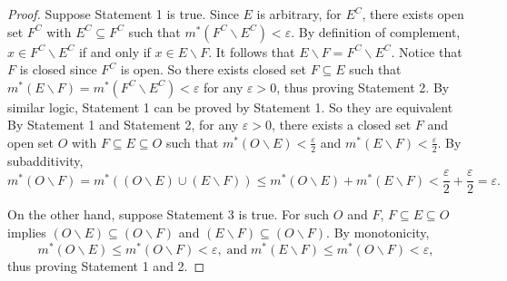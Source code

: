 \documentclass[class=book, crop=false]{standalone}
\begin{document}
    \begin{proof}
        Suppose Statement 1 is true. Since $E$ is arbitrary, for $E^C$, there exists open set $F^C$ with $E^C \subseteq F^C$ such that $m^*(F^C \backslash E^C) < \varepsilon$. By definition of complement, $x \in F^C \backslash E^C$ if and only if $x \in E \backslash F$. It follows that $E \backslash F = F^C \backslash E^C$. Notice that $F$ is closed since $F^C$ is open. So there exists closed set $F \subseteq E$ such that $m^*(E \backslash F) = m^*(F^C \backslash E^C) < \varepsilon$ for any $\varepsilon > 0$, thus proving Statement 2. By similar logic, Statement 1 can be proved by Statement 1. So they are equivalent\\

        \noindent By Statement 1 and Statement 2, for any $\varepsilon > 0$, there exists a closed set $F$ and open set $O$ with $F \subseteq E \subseteq O$ such that $m^*(O \backslash E) < \frac{\varepsilon}{2}$ and $m^*(E \backslash F) < \frac{\varepsilon}{2}$. By subadditivity,
        \begin{equation*}
            m^*(O \backslash F) = m^*((O \backslash E) \cup (E \backslash F)) \leq m^*(O \backslash E) + m^*(E \backslash F) < \frac{\varepsilon}{2} + \frac{\varepsilon}{2} = \varepsilon.
        \end{equation*}

        \noindent On the other hand, suppose Statement 3 is true. For such $O$ and $F$, $F \subseteq E \subseteq O$ implies $(O \backslash E) \subseteq (O \backslash F)$ and $(E \backslash F) \subseteq (O \backslash F)$. By monotonicity,
        \begin{equation*}
            m^*(O \backslash E) \leq m^*(O \backslash F) < \varepsilon, \;\text{and}\; m^*(E \backslash F) \leq m^*(O \backslash F) < \varepsilon,
        \end{equation*}
        thus proving Statement 1 and 2.
    \end{proof}
\end{document}
